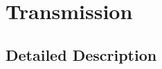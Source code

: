 \hypertarget{group__transmission}{}\section{Transmission}
\label{group__transmission}


\subsection{Detailed Description}

